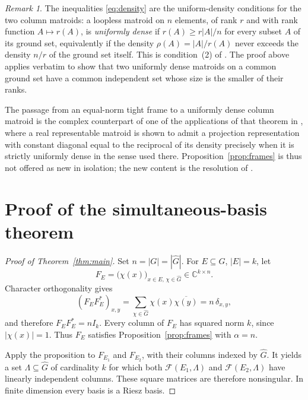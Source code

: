 \documentclass[11pt]{amsart}
\theoremstyle{remark}
\newtheorem{remark}[theorem]{Remark}
\newcommand{\C}{\mathbb{C}}
\begin{document}
\begin{remark}\label{rem:density}
The inequalities \eqref{eq:density} are the uniform-density
conditions for the two column matroids: a loopless matroid on $n$
elements, of rank $r$ and with rank function $A\mapsto r(A)$, is
\emph{uniformly dense} if $r(A)\geq r|A|/n$ for every subset $A$ of
its ground set, equivalently if the density $\rho(A)=|A|/r(A)$ never
exceeds the density $n/r$ of the ground set itself. This is
condition~(2) of
\cite[Theorem~1.1]{DevriendtMulas}. The proof above applies verbatim
to show that two uniformly dense matroids on a common ground set have
a common independent set whose size is the smaller of their ranks.

The passage from an equal-norm tight frame to a uniformly dense column
matroid is the complex counterpart of one of the applications of that
theorem in \cite{DevriendtMulas}, where a real representable matroid
is shown to admit a projection representation with constant diagonal
equal to the reciprocal of its density precisely when it is strictly
uniformly dense in the sense used there.
Proposition~\ref{prop:frames} is thus not offered as new in isolation;
the new content is the resolution of \cite[Question~1.8]{FMS}.
\end{remark}

\section{Proof of the simultaneous-basis theorem}

\begin{proof}[Proof of Theorem~\ref{thm:main}]
Set $n=|G|=|\widehat G|$. For $E\subseteq G$, $|E|=k$, let
\[
  F_E=
  \bigl(\chi(x)\bigr)_{x\in E,\,\chi\in\widehat G}
  \in\C^{k\times n}.
\]
Character orthogonality gives
\[
  (F_EF_E^*)_{x,y}
  =
  \sum_{\chi\in\widehat G}\chi(x)\overline{\chi(y)}
  =n\,\delta_{x,y},
\]
and therefore $F_EF_E^*=nI_k$. Every column of $F_E$ has squared
norm $k$, since $|\chi(x)|=1$. Thus $F_E$ satisfies
Proposition~\ref{prop:frames} with $\alpha=n$.

Apply the proposition to $F_{E_1}$ and $F_{E_2}$, with their columns
indexed by $\widehat G$. It yields a set
$\Lambda\subseteq\widehat G$ of cardinality $k$ for which both
$\mathcal F(E_1,\Lambda)$ and $\mathcal F(E_2,\Lambda)$ have
linearly independent columns. These square matrices are therefore
nonsingular. In finite dimension every basis is a Riesz basis.
\end{proof}
\end{document}
